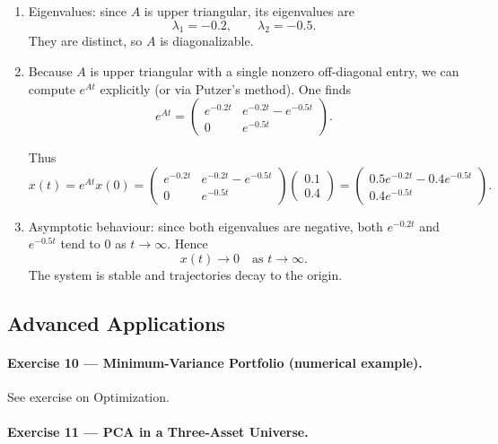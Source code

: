 \documentclass[11pt]{article}
\begin{document}
\begin{enumerate}
\item Eigenvalues: since $A$ is upper triangular, its eigenvalues are
\[
\lambda_1=-0.2,\qquad \lambda_2=-0.5.
\]
They are distinct, so $A$ is diagonalizable.

\item Because $A$ is upper triangular with a single nonzero off-diagonal entry, we can compute $e^{At}$ explicitly (or via Putzer’s method). One finds
\[
e^{At} =
\begin{pmatrix}
e^{-0.2 t} & e^{-0.2 t} - e^{-0.5 t}\\
0 & e^{-0.5 t}
\end{pmatrix}.
\]

Thus
\[
x(t) = e^{At}x(0)
=
\begin{pmatrix}
e^{-0.2 t} & e^{-0.2 t} - e^{-0.5 t}\\
0 & e^{-0.5 t}
\end{pmatrix}
\begin{pmatrix}0.1\\0.4\end{pmatrix}
=
\begin{pmatrix}
0.5 e^{-0.2 t} - 0.4 e^{-0.5 t}\\
0.4 e^{-0.5 t}
\end{pmatrix}.
\]

\item Asymptotic behaviour: since both eigenvalues are negative, both $e^{-0.2t}$ and $e^{-0.5t}$ tend to $0$ as $t\to\infty$. Hence
\[
x(t)\to 0\quad \text{as }t\to\infty.
\]
The system is stable and trajectories decay to the origin.
\end{enumerate}

\bigskip


\subsection*{Advanced Applications}

\paragraph{Exercise 10 — Minimum-Variance Portfolio (numerical example).}
See exercise on Optimization.

\bigskip

\paragraph{Exercise 11 — PCA in a Three-Asset Universe.}
\end{document}
